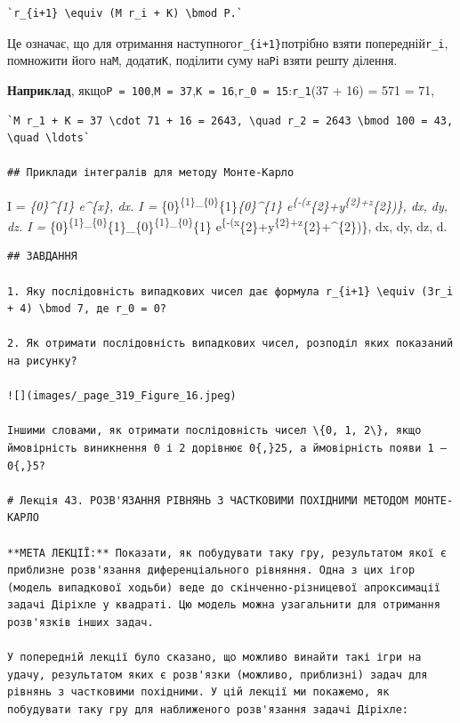 \documentclass[
  ukrainian,
]{article}
\begin{document}
\begin{verbatim}
`r_{i+1} \equiv (M r_i + K) \bmod P.`
\end{verbatim}

Це означає, що для отримання наступного\texttt{r\_\{i+1\}}потрібно взяти
попередній\texttt{r\_i}, помножити його на\texttt{M}, додати\texttt{K},
поділити суму на\texttt{P}і взяти решту ділення.

\textbf{Наприклад},
якщо\texttt{P\ =\ 100},\texttt{M\ =\ 37},\texttt{K\ =\ 16},\texttt{r\_0\ =\ 15}:\texttt{r\_1}\equiv (37
 + 16)  = 571  = 71,

\begin{verbatim}
`M r_1 + K = 37 \cdot 71 + 16 = 2643, \quad r_2 = 2643 \bmod 100 = 43, \quad \ldots`

## Приклади інтегралів для методу Монте-Карло
\end{verbatim}

I = \int\emph{\{0\}\^{}\{1\} e\^{}\{\sin x\}, dx. I =
\int}\{0\}\textsuperscript{\{1\}\int\_\{0\}}\{1\}\int\emph{\{0\}\^{}\{1\}
e\textsuperscript{\{-(x}\{2\}+y\textsuperscript{\{2\}+z}\{2\})\}, dx,
dy, dz. I =
\int}\{0\}\textsuperscript{\{1\}\int\_\{0\}}\{1\}\int\_\{0\}\textsuperscript{\{1\}\int\_\{0\}}\{1\}
e\textsuperscript{\{-(x}\{2\}+y\textsuperscript{\{2\}+z}\{2\}+\omega\^{}\{2\})\},
dx, dy, dz, d\omega.

\begin{verbatim}
## ЗАВДАННЯ

1. Яку послідовність випадкових чисел дає формула r_{i+1} \equiv (3r_i + 4) \bmod 7, де r_0 = 0?

2. Як отримати послідовність випадкових чисел, розподіл яких показаний на рисунку?

![](images/_page_319_Figure_16.jpeg)

Іншими словами, як отримати послідовність чисел \{0, 1, 2\}, якщо ймовірність виникнення 0 і 2 дорівнює 0{,}25, а ймовірність появи 1 — 0{,}5?

# Лекція 43. РОЗВ'ЯЗАННЯ РІВНЯНЬ З ЧАСТКОВИМИ ПОХІДНИМИ МЕТОДОМ МОНТЕ-КАРЛО

**МЕТА ЛЕКЦІЇ:** Показати, як побудувати таку гру, результатом якої є приблизне розв'язання диференціального рівняння. Одна з цих ігор (модель випадкової ходьби) веде до скінченно-різницевої апроксимації задачі Діріхле у квадраті. Цю модель можна узагальнити для отримання розв'язків інших задач.

У попередній лекції було сказано, що можливо винайти такі ігри на удачу, результатом яких є розв'язки (можливо, приблизні) задач для рівнянь з частковими похідними. У цій лекції ми покажемо, як побудувати таку гру для наближеного розв'язання задачі Діріхле:
\end{verbatim}
\end{document}
